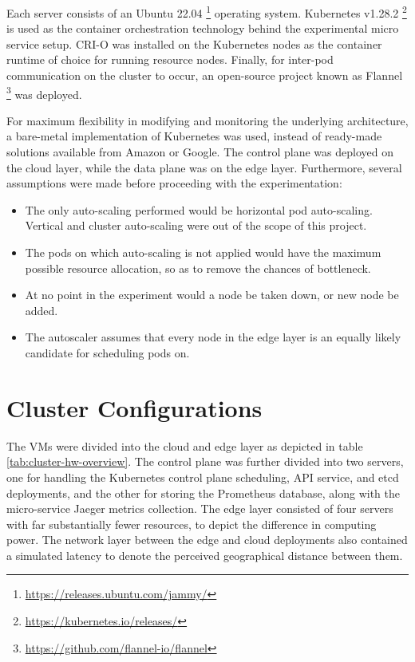 Each server consists of an Ubuntu 22.04 \footnote{\url{https://releases.ubuntu.com/jammy/}} operating system. Kubernetes v1.28.2 \footnote{\url{https://kubernetes.io/releases/}} is used as the container orchestration technology behind the experimental micro service setup. CRI-O was installed on the Kubernetes nodes as the container runtime of choice for running resource nodes. Finally, for inter-pod communication on the cluster to occur, an open-source project known as Flannel \footnote{\url{https://github.com/flannel-io/flannel}} was deployed.\par

For maximum flexibility in modifying and monitoring the underlying architecture, a bare-metal implementation of Kubernetes was used, instead of ready-made solutions available from Amazon or Google. The control plane was deployed on the cloud layer, while the data plane was on the edge layer. Furthermore, several assumptions were made before proceeding with the experimentation:

\begin{itemize}
    \item The only auto-scaling performed would be horizontal pod auto-scaling. Vertical and cluster auto-scaling were out of the scope of this project.
    \item The pods on which auto-scaling is not applied would have the maximum possible resource allocation, so as to remove the chances of bottleneck.
    \item At no point in the experiment would a node be taken down, or new node be added.
    \item The autoscaler assumes that every node in the edge layer is an equally likely candidate for scheduling pods on.
\end{itemize}

\section{Cluster Configurations}
\label{sec:ch6-cluster-config}

The VMs were divided into the cloud and edge layer as depicted in table \ref{tab:cluster-hw-overview}. The control plane was further divided into two servers, one for handling the Kubernetes control plane scheduling, API service, and etcd deployments, and the other for storing the Prometheus database, along with the micro-service Jaeger metrics collection. The edge layer consisted of four servers with far substantially fewer resources, to depict the difference in computing power. The network layer between the edge and cloud deployments also contained a simulated latency to denote the perceived geographical distance between them.\par

